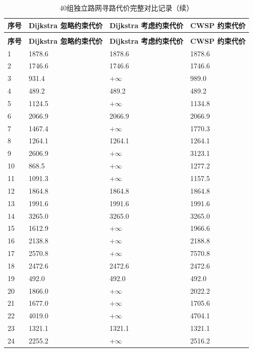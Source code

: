 \begin{longtable}{@{}p{}p{}p{}p{}@{}}
\caption{40组独立路网寻路代价完整对比记录} \label{tab:exp1_40cases_full_appendix} \\
\toprule
\textbf{序号} & \textbf{Dijkstra 忽略约束代价} & \textbf{Dijkstra 考虑约束代价} & \textbf{CWSP 约束代价} \\
\midrule
\endfirsthead
\caption[]{40组独立路网寻路代价完整对比记录（续）} \\
\toprule
\textbf{序号} & \textbf{Dijkstra 忽略约束代价} & \textbf{Dijkstra 考虑约束代价} & \textbf{CWSP 约束代价} \\
\midrule
\endhead
1 & 1878.6 & 1878.6 & 1878.6 \\
\hline
2 & 1746.6 & 1746.6 & 1746.6 \\
\hline
3 & 931.4 & $+\infty$ & 989.0 \\
\hline
4 & 489.2 & 489.2 & 489.2 \\
\hline
5 & 1124.5 & $+\infty$ & 1134.8 \\
\hline
6 & 2066.9 & 2066.9 & 2066.9 \\
\hline
7 & 1467.4 & $+\infty$ & 1770.3 \\
\hline
8 & 1264.1 & 1264.1 & 1264.1 \\
\hline
9 & 2606.9 & $+\infty$ & 3123.1 \\
\hline
10 & 868.5 & $+\infty$ & 1277.2 \\
\hline
11 & 1091.3 & $+\infty$ & 1157.5 \\
\hline
12 & 1864.8 & 1864.8 & 1864.8 \\
\hline
13 & 1991.6 & 1991.6 & 1991.6 \\
\hline
14 & 3265.0 & 3265.0 & 3265.0 \\
\hline
15 & 1612.9 & $+\infty$ & 1966.6 \\
\hline
16 & 2138.8 & $+\infty$ & 2188.8 \\
\hline
17 & 2570.8 & $+\infty$ & 7570.8 \\
\hline
18 & 2472.6 & 2472.6 & 2472.6 \\
\hline
19 & 492.0 & 492.0 & 492.0 \\
\hline
20 & 1866.0 & $+\infty$ & 2022.2 \\
\hline
21 & 1677.0 & $+\infty$ & 1705.6 \\
\hline
22 & 4019.0 & $+\infty$ & 4704.1 \\
\hline
23 & 1321.1 & 1321.1 & 1321.1 \\
\hline
24 & 2255.2 & $+\infty$ & 2516.2 \\

\end{longtable}
